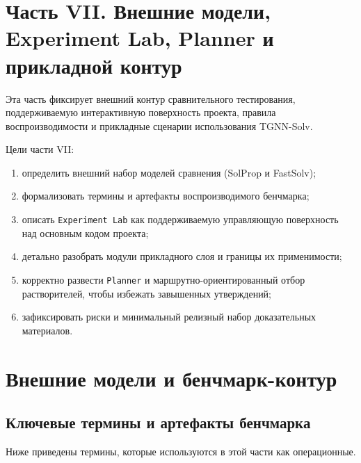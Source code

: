 \documentclass[11pt]{article}
\begin{document}
\section*{Часть VII. Внешние модели, Experiment Lab, Planner и прикладной контур}

Эта часть фиксирует внешний контур сравнительного тестирования, поддерживаемую интерактивную поверхность проекта, правила воспроизводимости и прикладные сценарии использования TGNN-Solv.

Цели части VII:
\begin{enumerate}
  \item определить внешний набор моделей сравнения (SolProp и FastSolv);
  \item формализовать термины и артефакты воспроизводимого бенчмарка;
  \item описать \texttt{Experiment Lab} как поддерживаемую управляющую поверхность над основным кодом проекта;
  \item детально разобрать модули прикладного слоя и границы их применимости;
  \item корректно развести \texttt{Planner} и маршрутно-ориентированный отбор растворителей, чтобы избежать завышенных утверждений;
  \item зафиксировать риски и минимальный релизный набор доказательных материалов.
\end{enumerate}

\section{Внешние модели и бенчмарк-контур}

\subsection{Ключевые термины и артефакты бенчмарка}

Ниже приведены термины, которые используются в этой части как операционные.
\end{document}
